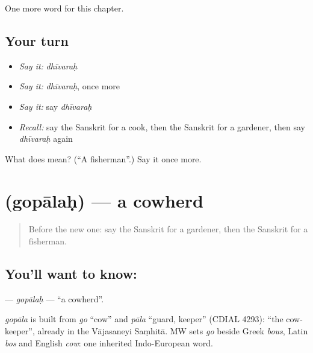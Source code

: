 \begin{grammarlens}[title={What you've built}]
One more word for this chapter.
\end{grammarlens}

\subsection*{Your turn}
\begin{itemize}
\raggedright
  \item \emph{Say it:} \emph{dhīvaraḥ}
  \item \emph{Say it:} \emph{dhīvaraḥ}, once more
  \item \emph{Say it:} say \emph{dhīvaraḥ}
  \item \emph{Recall:} say the Sanskrit for a cook, then the Sanskrit for a gardener, then say \emph{dhīvaraḥ} again
\end{itemize}

\begin{tcolorbox}[breakable,colback=teal!4,colframe=teal!35!black,title={Before you move on}]
What does  mean? (\textquotedblleft{}A fisherman\textquotedblright{}.) Say it once more.
\end{tcolorbox}
\section[\texorpdfstring{\sk{गोपालः} (gopālaḥ)}{गोपालः (gopālaḥ)}]{ (gopālaḥ) — a cowherd}

\label{lesson:SA-C148-gopalah}



\begin{quote}
Before the new one: say the Sanskrit for a gardener, then the Sanskrit for a fisherman.
\end{quote}

\subsection*{You'll want to know: }
\textbf{} — \emph{gopālaḥ} — \textquotedblleft{}a cowherd\textquotedblright{}.

\begin{cousinweb}
\emph{gopāla} is built from \emph{go} \textquotedblleft{}cow\textquotedblright{} and \emph{pāla} \textquotedblleft{}guard, keeper\textquotedblright{} (CDIAL 4293): \textquotedblleft{}the cow-keeper\textquotedblright{}, already in the Vājasaneyi Saṃhitā. MW sets \emph{go} beside Greek \emph{bous}, Latin \emph{bos} and English \emph{cow}: one inherited Indo-European word.
\end{cousinweb}

